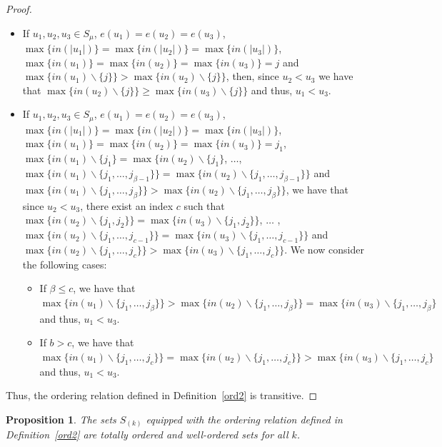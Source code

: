 \documentclass[11pt]{amsart}
\newtheorem{prop}{Proposition}
\begin{document}
\begin{proof}
\begin{itemize}
\item[v.] If $u_1, u_2, u_3\in S_{\mu}$, $e(u_1)=e(u_2)=e(u_3)$, $\max\{in(|u_1|) \} = \max\{in(|u_2|)\} = \max\{in(|u_3|)\}$, $\max\{in(u_1) \} = \max\{in(u_2)\} = \max\{in(u_3)\} = j$ and $\max\{in(u_1)\backslash \{j\} \} > \max\{in(u_2)\backslash \{j\}\}$, then, since $u_2<u_3$ we have that $\max\{in(u_2)\backslash \{j\} \} \geq \max\{in(u_3)\backslash \{j\}\}$ and thus, $u_1 < u_3$.

\bigbreak

\item[vi.] If $u_1, u_2, u_3\in S_{\mu}$, $e(u_1)=e(u_2)=e(u_3)$, $\max\{in(|u_1|) \} = \max\{in(|u_2|)\} = \max\{in(|u_3|)\}$, $\max\{in(u_1) \} = \max\{in(u_2)\} = \max\{in(u_3)\} = j_1$, $\max\{in(u_1)\backslash \{j_1\} = \max\{in(u_2)\backslash \{j_1\}$, $\ldots$, $\max\{in(u_1)\backslash \{j_1, \ldots, j_{\beta-1}\} \} = \max\{in(u_2)\backslash \{j_1, \ldots, j_{\beta-1}\} \}$ and \\
$\max\{in(u_1)\backslash \{j_1, \ldots, j_{\beta}\} \} > \max\{in(u_2)\backslash \{j_1, \ldots, j_{\beta}\} \}$, we have that since $u_2<u_3$, there exist an index $c$ such that $\max\{in(u_2)\backslash \{j_1, j_2\}\} = \max\{in(u_3)\backslash \{j_1, j_2\}\}$, $\ldots$ , \\
$\max\{in(u_2)\backslash \{j_1, \ldots, j_{c-1}\} \} = \max\{in(u_3)\backslash \{j_1, \ldots, j_{c-1}\} \}$ and \\
$\max\{in(u_2)\backslash \{j_1, \ldots, j_{c}\} \} > \max\{in(u_3)\backslash \{j_1, \ldots, j_{c}\} \}$. We now consider the following cases:
\smallbreak
\begin{itemize}
\item[a.] If $\beta \leq c$, we have that\\
$\max\{in(u_1)\backslash \{j_1, \ldots, j_{\beta}\} \} > \max\{in(u_2)\backslash \{j_1, \ldots, j_{\beta}\} \} =  \max\{in(u_3)\backslash \{j_1, \ldots, j_{\beta}\}$ and thus, $u_1 < u_3$.
\smallbreak
\item[b.] If $b > c$, we have that\\
$\max\{in(u_1)\backslash \{j_1, \ldots, j_{c}\} \} = \max\{in(u_2)\backslash \{j_1, \ldots, j_{c}\} \} >  \max\{in(u_3)\backslash \{j_1, \ldots, j_{c}\}$ and thus, $u_1 < u_3$.
\end{itemize}
\end{itemize}
\noindent Thus, the ordering relation defined in Definition~\ref{ord2} is transitive.
\end{proof}


\begin{prop}
The sets $S_{(k)}$ equipped with the ordering relation defined in Definition~\ref{ord2} are totally ordered and well-ordered sets for all $k$.
\end{prop}
\end{document}
